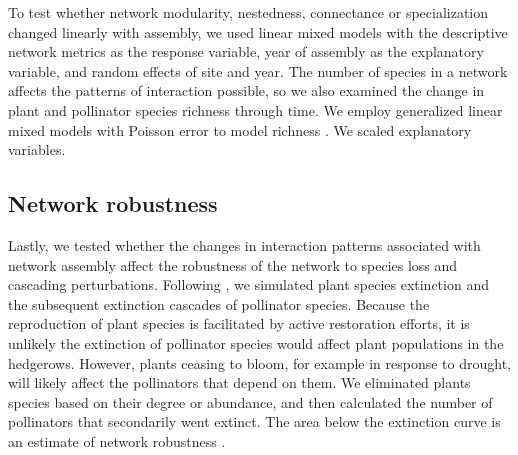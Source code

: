 \documentclass[12pt]{article}
\begin{document}
To test whether network modularity, nestedness, connectance or
specialization changed linearly with assembly, we used linear mixed
models with the descriptive network metrics as the response variable,
year of assembly as the explanatory variable, and random effects of
site and year. The number of species in a network affects the patterns
of interaction possible, so we also examined the change in plant and
pollinator species richness through time. We employ generalized linear
mixed models with Poisson error to model richness \citep{lme4}. We
scaled explanatory variables.


\subsection*{Network robustness}
Lastly, we tested whether the changes in interaction patterns
associated with network assembly affect the robustness of the network
to species loss and cascading perturbations. Following
\cite{Memmott2004}, we simulated plant species extinction and the
subsequent extinction cascades of pollinator species. Because the
reproduction of plant species is facilitated by active restoration
efforts, it is unlikely the extinction of pollinator species would
affect plant populations in the hedgerows. However, plants ceasing to
bloom, for example in response to drought, will likely affect the
pollinators that depend on them. We eliminated plants species based on
their degree or abundance, and then calculated the number of
pollinators that secondarily went extinct. The area below the
extinction curve is an estimate of network robustness
\citep{Memmott2004, bipartite}.
\end{document}
